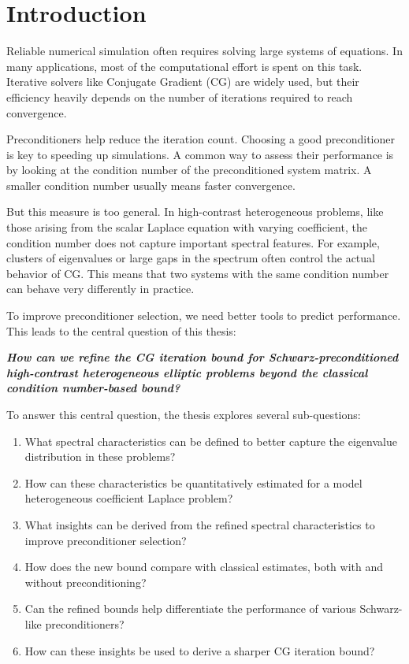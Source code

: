 \chapter{Introduction}\label{ch:introduction}\newpage
Reliable numerical simulation often requires solving large systems of equations. In many applications, most of the computational effort is spent on this task. Iterative solvers like Conjugate Gradient (CG) are widely used, but their efficiency heavily depends on the number of iterations required to reach convergence.

Preconditioners help reduce the iteration count. Choosing a good preconditioner is key to speeding up simulations. A common way to assess their performance is by looking at the condition number of the preconditioned system matrix. A smaller condition number usually means faster convergence.

But this measure is too general. In high-contrast heterogeneous problems, like those arising from the scalar Laplace equation with varying coefficient, the condition number does not capture important spectral features. For example, clusters of eigenvalues or large gaps in the spectrum often control the actual behavior of CG. This means that two systems with the same condition number can behave very differently in practice.

To improve preconditioner selection, we need better tools to predict performance. This leads to the central question of this thesis:

\vspace{0.5em}
\begin{center}
\textit{\textbf{How can we refine the CG iteration bound for Schwarz-preconditioned high-contrast heterogeneous elliptic problems beyond the classical condition number-based bound?}}
\end{center}
\vspace{0.5em}

To answer this central question, the thesis explores several sub-questions:
\begin{enumerate}
    \item What spectral characteristics can be defined to better capture the eigenvalue distribution in these problems?
    \item How can these characteristics be quantitatively estimated for a model heterogeneous coefficient Laplace problem?
    \item What insights can be derived from the refined spectral characteristics to improve preconditioner selection?
    \item How does the new bound compare with classical estimates, both with and without preconditioning?
    \item Can the refined bounds help differentiate the performance of various Schwarz-like preconditioners?
    \item How can these insights be used to derive a sharper CG iteration bound?
\end{enumerate}

